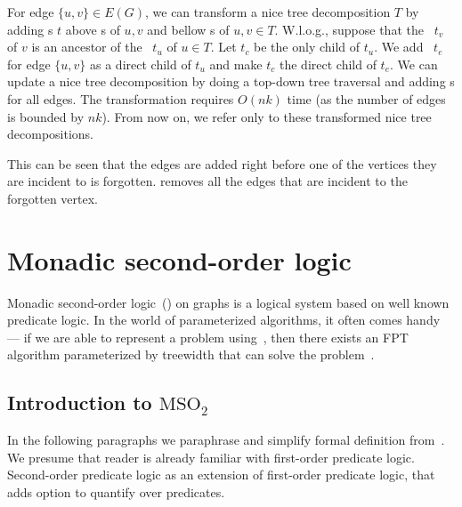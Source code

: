 For edge \( \{u, v\} \in E(G) \), we can transform a nice tree decomposition \( T \)
by adding \IntroduceEdgeNode{}s \( t \) above \IntroduceVertexNode{}s of \( u, v \)
and bellow \ForgetVertexNode{}s of \( u, v \in T \).
%
W.l.o.g., suppose that the \ForgetVertexNode{}~\( t_v \) of \( v \) is
an ancestor of the \ForgetVertexNode{}~\( t_u \) of \( u \in T \).
Let \( t_c \) be the only child of \( t_u \).
%
We add \IntroduceEdgeNode{}~\( t_e \) for edge \( \{u, v\} \)
as a direct child of \( t_u \) and make \( t_c \) the direct child of \( t_e \).
%
We can update a nice tree decomposition by doing
a top-down tree traversal and adding \IntroduceEdgeNode{}s for all edges.
The transformation requires \( O(nk) \) time (as the number of edges is bounded by \( nk \)).
From now on, we refer only to these transformed nice tree decompositions.

%
%
This can be seen that the edges are added right before one of the vertices
they are incident to is forgotten. \ForgetVertexNode{} removes all the edges
that are incident to the forgotten vertex.


\section{Monadic second-order logic}

Monadic second-order logic~(\MSO{}) on graphs is a logical system based on
well known predicate logic.
In the world of parameterized algorithms,
it often comes handy --- if we are able to represent a problem using~\MSO{},
then there exists an FPT algorithm parameterized by treewidth
that can solve the problem~\cite{tree_width_mso}.

\subsection{Introduction to \( \text{MSO}_2 \)}

In the following paragraphs we paraphrase and simplify formal definition
from~\cite{book_parametrized_algorithms}.
We presume that reader is already familiar with first-order predicate logic.
Second-order predicate logic as an extension of first-order predicate logic,
that adds option to quantify over predicates.

